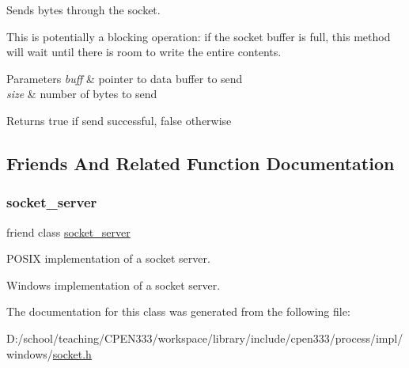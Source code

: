 Sends bytes through the socket. 

This is potentially a blocking operation\+: if the socket buffer is full, this method will wait until there is room to write the entire contents.


\begin{DoxyParams}{Parameters}
{\em buff} & pointer to data buffer to send \\
\hline
{\em size} & number of bytes to send \\
\hline
\end{DoxyParams}
\begin{DoxyReturn}{Returns}
true if send successful, false otherwise 
\end{DoxyReturn}


\subsection{Friends And Related Function Documentation}
\mbox{\label{classcpen333_1_1process_1_1windows_1_1socket_aba37c0ea463da9263b0712d3b3389066}} 
\subsubsection{\texorpdfstring{socket\+\_\+server}{socket\_server}}
{\footnotesize\ttfamily friend class \hyperlink{classcpen333_1_1process_1_1windows_1_1socket__server}{socket\+\_\+server}\hspace{0.3cm}{\ttfamily [friend]}}



P\+O\+S\+IX implementation of a socket server. 

Windows implementation of a socket server. 

The documentation for this class was generated from the following file\+:\begin{DoxyCompactItemize}
\item 
D\+:/school/teaching/\+C\+P\+E\+N333/workspace/library/include/cpen333/process/impl/windows/\hyperlink{impl_2windows_2socket_8h}{socket.\+h}\end{DoxyCompactItemize}
